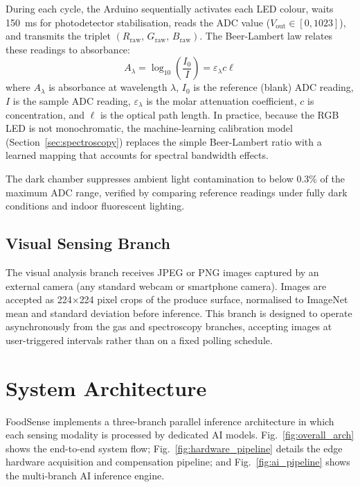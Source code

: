 \documentclass{ieeeaccess}
\begin{document}
During each cycle, the Arduino sequentially activates each LED colour, waits 150~ms for photodetector stabilisation, reads the ADC value ($V_{\text{out}} \in [0, 1023]$), and transmits the triplet $(R_{\text{raw}},\, G_{\text{raw}},\, B_{\text{raw}})$. The Beer-Lambert law relates these readings to absorbance:
\begin{equation}
  A_\lambda = \log_{10}\!\left(\frac{I_0}{I}\right) = \varepsilon_\lambda c \ell
  \label{eq:beerlam}
\end{equation}
where $A_\lambda$ is absorbance at wavelength $\lambda$, $I_0$ is the reference (blank) ADC reading, $I$ is the sample ADC reading, $\varepsilon_\lambda$ is the molar attenuation coefficient, $c$ is concentration, and $\ell$ is the optical path length. In practice, because the RGB LED is not monochromatic, the machine-learning calibration model (Section~\ref{sec:spectroscopy}) replaces the simple Beer-Lambert ratio with a learned mapping that accounts for spectral bandwidth effects.

The dark chamber suppresses ambient light contamination to below 0.3\% of the maximum ADC range, verified by comparing reference readings under fully dark conditions and indoor fluorescent lighting.

\subsection{Visual Sensing Branch}

The visual analysis branch receives JPEG or PNG images captured by an external camera (any standard webcam or smartphone camera). Images are accepted as 224$\times$224 pixel crops of the produce surface, normalised to ImageNet mean and standard deviation before inference. This branch is designed to operate asynchronously from the gas and spectroscopy branches, accepting images at user-triggered intervals rather than on a fixed polling schedule.

\section{System Architecture}
\label{sec:architecture}

FoodSense implements a three-branch parallel inference architecture in which each sensing modality is processed by dedicated AI models. Fig.~\ref{fig:overall_arch} shows the end-to-end system flow; Fig.~\ref{fig:hardware_pipeline} details the edge hardware acquisition and compensation pipeline; and Fig.~\ref{fig:ai_pipeline} shows the multi-branch AI inference engine.
\end{document}
